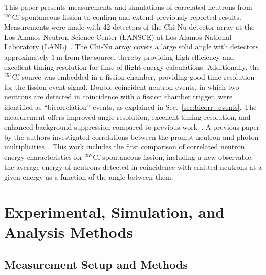 \documentclass[preprint,12pt]{elsarticle}
\newcommand{\secref}[1]  {Sec.~\ref{#1}}
\newcommand{\genunit}[2]{\ensuremath{#1~\text{#2}}\xspace}
\newcommand{\meters}[1] {\genunit{#1}{m}}
\newcommand{\Cftft}{\ensuremath{^{252}\text{Cf}}\xspace}
\begin{document}
This paper presents measurements and simulations of correlated neutrons from \Cftft spontaneous fission to confirm and extend previously reported results. Measurements were made with 42 detectors of the Chi-Nu detector array at the Los Alamos Neutron Science Center (LANSCE) at Los Alamos National Laboratory (LANL)~\cite{Perdue2014,MarcathThesis2018}. The Chi-Nu array covers a large solid angle with detectors approximately \meters{1} from the source, thereby providing high efficiency and excellent timing resolution for time-of-flight energy calculations. Additionally, the \Cftft source was embedded in a fission chamber, providing good time resolution for the fission event signal. Double coincident neutron events, in which two neutrons are detected in coincidence with a fission chamber trigger, were identified as ``bicorrelation'' events, as explained in \secref{sec:bicorr_events}. 
The measurement offers improved angle resolution, excellent timing resolution, and enhanced background suppression compared to previous work~\cite{Larsen2014,Verbeke2018b}. A previous paper by the authors investigated correlations between the prompt neutron and photon multiplicities~\cite{Marcath2018}. This work includes the first comparison of correlated neutron energy characteristics for \Cftft spontaneous fission, including a new observable: the average energy of neutrons detected in coincidence with emitted neutrons at a given energy as a function of the angle between them.


\section{Experimental, Simulation, and Analysis Methods}

\subsection{Measurement Setup and Methods}
\end{document}
